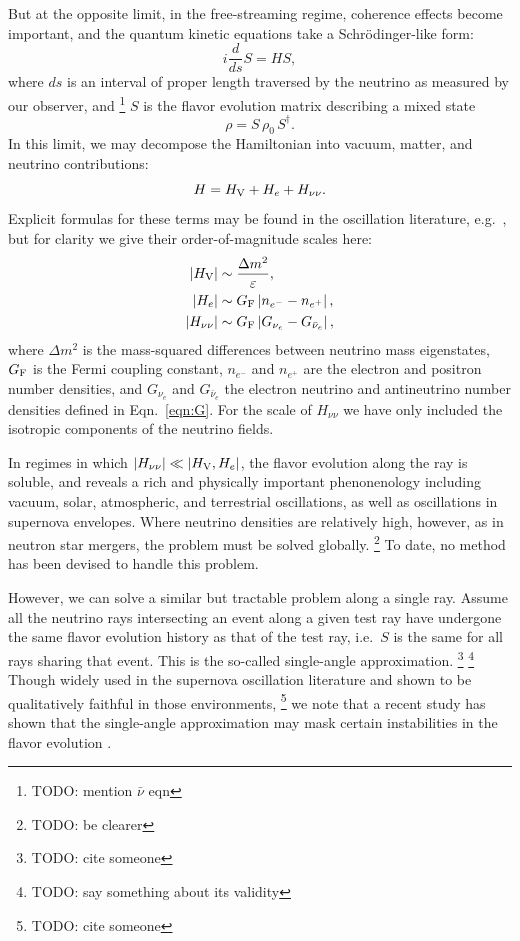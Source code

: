 \documentclass[aps,floatfix,prd,superscriptaddress,twocolumn]{revtex4-1}
\begin{document}
But at the opposite limit, in the free-streaming regime,
coherence effects become important,
and the quantum kinetic equations take a Schr\"{o}dinger-like form:
\begin{equation}
  \label{eqn:schroedinger}
  i \frac{d}{ds} S = H S,
\end{equation}
where $ds$ is an interval of proper length traversed by the neutrino as
measured by our observer, and
\footnote{TODO: mention $\bar{\nu}$ eqn}
$S$ is the flavor evolution matrix describing a mixed state
\begin{equation}
  \label{eq:density_evolution}
  \rho = S \, \rho_0 \, S^\dagger.
\end{equation}
In this limit, we may decompose the Hamiltonian into vacuum,
matter, and neutrino contributions:
\begin{equation}
  \label{eqn:decompose_H}
  H = H_{\rm V} + H_e + H_{\nu\nu}.
\end{equation}
Explicit formulas for these terms may be found in the oscillation literature,
e.g.\ \cite{duan2009-review},
but for clarity we give their order-of-magnitude scales here:
\begin{align}
  \label{eqn:scale_H_V}
  |H_{\rm V}| &\sim \frac{\Delta m^2}{\varepsilon}, \\
  \label{eqn:scale_H_e}
  |H_e|       &\sim G_{\rm F}\left|n_{e^-}-n_{e^+}\right|, \\
  \label{eqn:scale_H_nunu}
  |H_{\nu\nu}|&\sim G_{\rm F} \left|G_{\nu_e}-G_{\bar{\nu}_e}\right|,
\end{align}
where $\Delta m^2$ is the mass-squared differences between neutrino mass
eigenstates,
$G_{\rm F}$ is the Fermi coupling constant,
$n_{e^-}$ and $n_{e^+}$ are the electron and positron number densities,
and $G_{\nu_e}$ and $G_{\bar{\nu}_e}$ the electron neutrino and antineutrino
number densities defined in Eqn.~\ref{eqn:G}.
For the scale of $H_{\nu\nu}$ we have only included the isotropic
components of the neutrino fields.

In regimes in which $|H_{\nu\nu}|\ll|H_{\rm V},H_e|$,
the flavor evolution along the ray is soluble, and reveals a rich
and physically important phenonenology including
vacuum, solar, atmospheric, and terrestrial oscillations,
as well as oscillations in supernova envelopes.
Where neutrino densities are relatively high, however,
as in neutron star mergers, the problem must be solved globally.
\footnote{TODO: be clearer}
To date, no method has been devised to handle this problem.

However, we can solve a similar but tractable problem along a single ray.
Assume all the neutrino rays intersecting an event along a given test ray
have undergone the same flavor evolution history as that of the test ray,
i.e.\ $S$ is the same for all rays sharing that event.
This is the so-called single-angle approximation.
\footnote{TODO: cite someone}
\footnote{TODO: say something about its validity}
Though widely used in the supernova oscillation literature
and shown to be qualitatively faithful in those environments,
\footnote{TODO: cite someone}
we note that a recent study has shown that the single-angle approximation
may mask certain instabilities in the flavor evolution
\cite{wu2017-fast_neutrino_conversions}.
\end{document}
